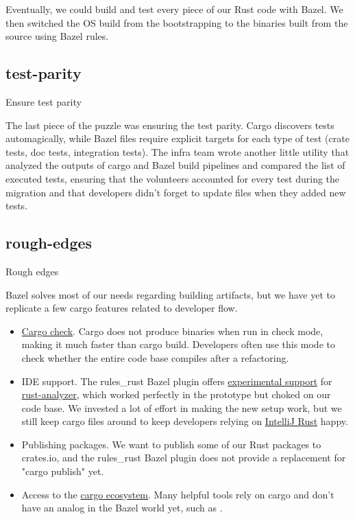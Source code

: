 \documentclass{article}
\begin{document}
Eventually, we could build and test every piece of our Rust code with Bazel. We then switched the OS build from the  bootstrapping to the binaries built from the source using Bazel rules.

\subsection{test-parity}{Ensure test parity}

The last piece of the puzzle was ensuring the test parity.
Cargo discovers tests automagically, while Bazel  files require explicit targets for each type of test (crate tests, doc tests, integration tests).
The infra team wrote another little utility that analyzed the outputs of cargo and Bazel build pipelines and compared the list of executed tests, ensuring that the volunteers accounted for every test during the migration and that developers didn't forget to update  files when they added new tests.

\subsection{rough-edges}{Rough edges}

Bazel solves most of our needs regarding building artifacts, but we have yet to replicate a few cargo features related to developer flow.

\begin{itemize}
  \item 
    \href{https://doc.rust-lang.org/cargo/commands/cargo-check.html}{Cargo check}.
    Cargo does not produce binaries when run in check mode, making it much faster than cargo build.
    Developers often use this mode to check whether the entire code base compiles after a refactoring.
  \item 
    IDE support.
    The rules_rust Bazel plugin offers \href{https://bazelbuild.github.io/rules_rust/rust_analyzer.html}{experimental support} for \href{https://rust-analyzer.github.io/}{rust-analyzer}, which worked perfectly in the prototype but choked on our code base.
    We invested a lot of effort in making the new setup work, but we still keep cargo files around to keep developers relying on \href{https://intellij-rust.github.io/}{IntelliJ Rust} happy. 
  \item 
    Publishing packages.
    We want to publish some of our Rust packages to crates.io, and the rules_rust Bazel plugin does not provide a replacement for "cargo publish" yet.
  \item 
    Access to the \href{https://github.com/rust-lang/cargo/wiki/Third-party-cargo-subcommands}{cargo ecosystem}.
    Many helpful tools rely on cargo and don't have an analog in the Bazel world yet, such as \href{https://github.com/dtolnay/cargo-expand}{}.
\end{itemize}
\end{document}
